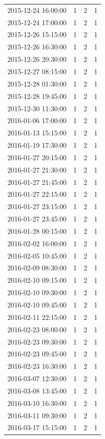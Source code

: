 \begin{tabular}{lrrr}
2015-12-24 16:00:00 & 1 & 2 & 1 \\
2015-12-24 17:00:00 & 1 & 2 & 1 \\
2015-12-26 15:15:00 & 1 & 2 & 1 \\
2015-12-26 16:30:00 & 1 & 2 & 1 \\
2015-12-26 20:30:00 & 1 & 2 & 1 \\
2015-12-27 08:15:00 & 1 & 2 & 1 \\
2015-12-28 01:30:00 & 1 & 2 & 1 \\
2015-12-28 19:45:00 & 1 & 2 & 1 \\
2015-12-30 11:30:00 & 1 & 2 & 1 \\
2016-01-06 17:00:00 & 1 & 2 & 1 \\
2016-01-13 15:15:00 & 1 & 2 & 1 \\
2016-01-19 17:30:00 & 1 & 2 & 1 \\
2016-01-27 20:15:00 & 1 & 2 & 1 \\
2016-01-27 21:30:00 & 1 & 2 & 1 \\
2016-01-27 21:45:00 & 1 & 2 & 1 \\
2016-01-27 22:15:00 & 1 & 2 & 1 \\
2016-01-27 23:15:00 & 1 & 2 & 1 \\
2016-01-27 23:45:00 & 1 & 2 & 1 \\
2016-01-28 00:15:00 & 1 & 2 & 1 \\
2016-02-02 16:00:00 & 1 & 2 & 1 \\
2016-02-05 10:45:00 & 1 & 2 & 1 \\
2016-02-09 08:30:00 & 1 & 2 & 1 \\
2016-02-10 09:15:00 & 1 & 2 & 1 \\
2016-02-10 09:30:00 & 1 & 2 & 1 \\
2016-02-10 09:45:00 & 1 & 2 & 1 \\
2016-02-11 22:15:00 & 1 & 2 & 1 \\
2016-02-23 08:00:00 & 1 & 2 & 1 \\
2016-02-23 09:30:00 & 1 & 2 & 1 \\
2016-02-23 09:45:00 & 1 & 2 & 1 \\
2016-02-23 16:30:00 & 1 & 2 & 1 \\
2016-03-07 12:30:00 & 1 & 2 & 1 \\
2016-03-08 13:45:00 & 1 & 2 & 1 \\
2016-03-10 16:30:00 & 1 & 2 & 1 \\
2016-03-11 09:30:00 & 1 & 2 & 1 \\
2016-03-17 15:15:00 & 1 & 2 & 1 \\

\end{tabular}

